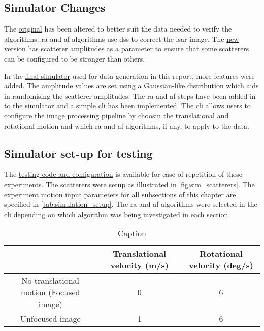\documentclass[class=report,11pt,crop=false]{standalone}
\begin{document}
    \subsection{Simulator Changes}
    The \href{https://github.com/tristynferreiro/QP4ISAR/blob/main/src/Simulator/Original%20Simulator%20Files/Version_3_object_translation_and_rotation_motion.m}{original} has been altered to better suit the data needed to verify the algorithms. \gls{ra} and \gls{af} algorithms use \gls{ds}s to correct the \gls{isar} image. The \href{https://github.com/tristynferreiro/QP4ISAR/blob/main/src/Simulator/Revised%20Simulator%20Files/Version_3_rev1_object_translation_and_rotation_motion.m}{new version} has scatterer amplitudes as a parameter to ensure that some scatterers can be configured to be stronger than others.
    
    In the \href{https://github.com/tristynferreiro/QP4ISAR/blob/main/src/Simulator/Final_Simulator.m}{final simulator} used for data generation in this report, more features were added. The amplitude values are set using a Gaussian-like distribution which aids in randomising the scatterer amplitudes. The \gls{ra} and \gls{af} steps have been added in to the simulator and a simple \gls{cli} has been implemented. The \gls{cli} allows users to configure the image processing pipeline by choosin the translational and rotational motion and which \gls{ra} and \gls{af} algorithms, if any, to apply to the data. 
    
    \subsection{Simulator set-up for testing}
    The \href{https://github.com/tristynferreiro/QP4ISAR/tree/main/src/Simulator/Testing%20Setup}{testing code and configuration} is available for ease of repetition of these experiments. The scatterers were setup as illustrated in \autoref{fig:sim_scatterers}. The experiment motion input parameters for all subsections of this chapter are specified in \autoref{tab:simulation_setup}. The \gls{ra} and \gls{af} algorithms were selected in the \gls{cli} depending on which algorithm was being investigated in each section.
    
    \begin{table}[ht]
        \centering
        {\small
        \begin{tabular}{|c|c|c|}
            \hline
            & \textbf{Translational velocity (m/s)} & \textbf{Rotational velocity (deg/s)} \\
            \hline
            No translational motion (Focused image) & 0 & 6 \\
            \hline
            Unfocused image & 1 & 6 \\
            \hline
        \end{tabular}
        }
        \caption{Caption}
        \label{tab:simulation_setup}
    \end{table}
\end{document}
